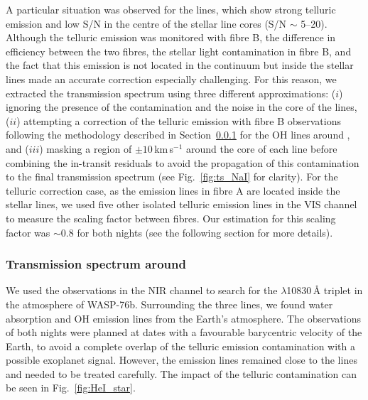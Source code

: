 \documentclass{aa}
\begin{document}
A particular situation was observed for the  lines, which show strong telluric  emission and low S/N in the centre of the stellar line cores (S/N $\sim$ 5--20). Although the telluric  emission was monitored with fibre B, the difference in efficiency between the two fibres, the stellar light contamination in fibre B, and the fact that this emission is not located in the continuum but inside the stellar  lines made an accurate correction especially challenging. For this reason, we extracted the transmission spectrum using three different approximations: 
($i$) ignoring the presence of the contamination and the noise in the core of the lines, 
($ii$) attempting a correction of the telluric  emission with fibre B observations following the methodology described in Section~\ref{subsec:nir} for the OH lines around , and 
($iii$) masking a region of $\pm10$\,km\,s$^{-1}$ around the core of each  line before combining the in-transit residuals to avoid the propagation of this contamination to the final transmission spectrum (see Fig.~\ref{fig:ts_NaI} for clarity). For the telluric correction case, as the  emission lines in fibre A are located inside the stellar  lines, we used five other isolated telluric emission lines in the VIS channel to measure the scaling factor between fibres. Our estimation for this scaling factor was $\sim0.8$ for both nights (see the following section for more details). 


\subsubsection{Transmission spectrum around } \label{subsec:nir}


We used the observations in the NIR channel to search for the  $\lambda$10830\,{\AA} triplet 
in the atmosphere of WASP-76b. Surrounding the three  lines, we found water absorption and OH emission lines from the Earth's atmosphere. 
The observations of both nights were planned at dates with a favourable barycentric velocity of the Earth, to avoid a complete overlap of the telluric emission contamination with a possible exoplanet  signal. However, the emission lines remained close to the  lines and needed to be treated carefully. The impact of the telluric contamination can be seen in Fig.~\ref{fig:HeI_star}.
\end{document}
